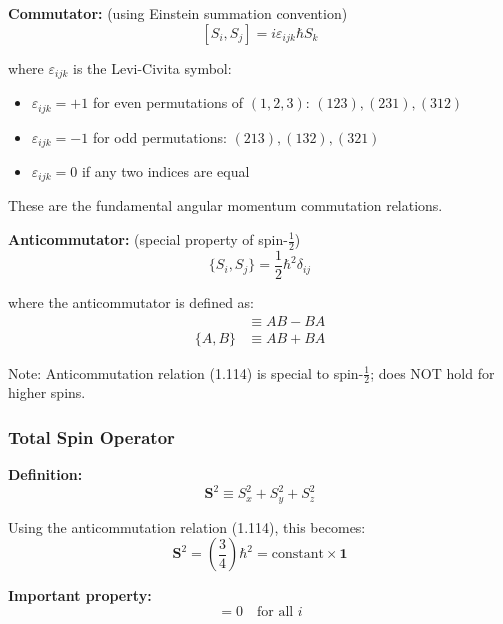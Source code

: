 \documentclass[11pt,a4paper]{article}
\begin{document}
\textbf{Commutator:} (using Einstein summation convention)
\begin{equation}
\boxed{[S_i, S_j] = i\varepsilon_{ijk}\hbar S_k}
\tag{1.113}
\end{equation}

where $\varepsilon_{ijk}$ is the Levi-Civita symbol:
\begin{itemize}
\item $\varepsilon_{ijk} = +1$ for even permutations of $(1,2,3)$: $(123), (231), (312)$
\item $\varepsilon_{ijk} = -1$ for odd permutations: $(213), (132), (321)$
\item $\varepsilon_{ijk} = 0$ if any two indices are equal
\end{itemize}

These are the fundamental angular momentum commutation relations.

\textbf{Anticommutator:} (special property of spin-$\frac{1}{2}$)
\begin{equation}
\boxed{\{S_i, S_j\} = \frac{1}{2}\hbar^2\delta_{ij}}
\tag{1.114}
\end{equation}

where the anticommutator is defined as:
\begin{align}
[A, B] &\equiv AB - BA \tag{1.115a} \\
\{A, B\} &\equiv AB + BA \tag{1.115b}
\end{align}

Note: Anticommutation relation (1.114) is special to spin-$\frac{1}{2}$; does NOT hold for higher spins.

\subsubsection{Total Spin Operator}

\textbf{Definition:}
\begin{equation}
\mathbf{S}^2 \equiv S_x^2 + S_y^2 + S_z^2
\tag{1.116}
\end{equation}

Using the anticommutation relation (1.114), this becomes:
\begin{equation}
\boxed{\mathbf{S}^2 = \left(\frac{3}{4}\right)\hbar^2 = \text{constant} \times \mathbf{1}}
\tag{1.117}
\end{equation}

\textbf{Important property:}
\begin{equation}
[\mathbf{S}^2, S_i] = 0 \quad \text{for all } i
\tag{1.118}
\end{equation}
\end{document}

